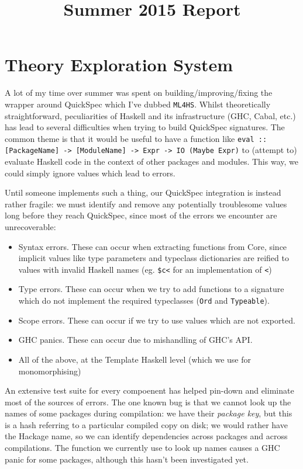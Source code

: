 \documentclass{article}
\begin{document}
\title{Summer 2015 Report}

\section{Theory Exploration System}\label{theory-exploration-system}

A lot of my time over summer was spent on building/improving/fixing the wrapper
around QuickSpec which I've dubbed \texttt{ML4HS}. Whilst theoretically
straightforward, peculiarities of Haskell and its infrastructure (GHC,
Cabal, etc.) has lead to several difficulties when trying to build
QuickSpec signatures. The common theme is that it would be useful to
have a function like
\texttt{eval :: [PackageName] -> [ModuleName] -> Expr -> IO (Maybe Expr)}
to (attempt to) evaluate Haskell code in the context of other packages
and modules. This way, we could simply ignore values which lead to
errors.

Until someone implements such a thing, our QuickSpec integration
is instead rather fragile: we must identify and remove any potentially
troublesome values long before they reach QuickSpec, since most of the
errors we encounter are unrecoverable:

\begin{itemize}
\item
  Syntax errors. These can occur when extracting functions from Core,
  since implicit values like type parameters and typeclass dictionaries
  are reified to values with invalid Haskell names (eg.
  \texttt{\$c\textless{}} for an implementation of
  \texttt{<})
\item
  Type errors. These can occur when we try to add functions to a
  signature which do not implement the required typeclasses
  (\texttt{Ord} and \texttt{Typeable}).
\item
  Scope errors. These can occur if we try to use values which are not
  exported.
\item
  GHC panics. These can occur due to mishandling of GHC's API.
\item
  All of the above, at the Template Haskell level (which we use for
  monomorphising)
\end{itemize}

An extensive test suite for every compoenent has helped pin-down and eliminate
most of the sources of errors. The one known bug is that we cannot look up the
names of some packages during compilation: we have their \emph{package key}, but
this is a hash referring to a particular compiled copy on disk; we would rather
have the Hackage name, so we can identify dependencies across packages and
across compilations. The function we currently use to look up names causes a GHC
panic for some packages, although this hasn't been investigated yet.
\end{document}
